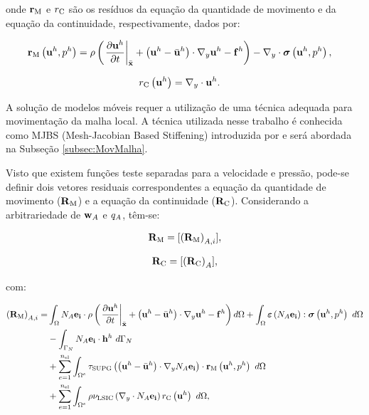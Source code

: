 \documentclass[tese_patricia]{subfiles}%
\begin{document}
\noindent onde $\mathbf{r}_{\mathrm{M}}$ e ${r}_{\mathrm{C}}$ são os resíduos da equação da quantidade de movimento e da equação da continuidade, respectivamente, dados por:

\begin{align}
\mathbf{r}_{\mathrm{M}}\left(\mathbf{u}^h,p^h\right)&=\rho\left(\left. \frac{\partial\mathbf{u}^h}{\partial t}\right|_{\bar{\mathbf{x}}}+\left(\mathbf{u}^h - \bar{\mathbf{u}}^h \right)\cdot \nabla_y \mathbf{u}^h - \mathbf{f}^h\right) - \nabla_y \cdot \boldsymbol{\sigma}\left(\mathbf{u}^h,p^h\right),
\end{align}

\noindent

\begin{align}
{r}_{\mathrm{C}}\left(\mathbf{u}^h\right)&=\nabla_y \cdot \mathbf{u}^h.
\end{align}

A solução de modelos móveis requer a utilização de uma técnica adequada para movimentação da malha local. A técnica utilizada nesse trabalho é conhecida como MJBS (Mesh-Jacobian Based Stiffening) introduzida por  e será abordada na Subseção \ref{subsec:MovMalha}.

Visto que existem funções teste separadas para a velocidade e pressão, pode-se definir dois vetores residuais correspondentes a equação da quantidade de movimento ($\mathbf{R}_\mathrm{M}$) e a equação da continuidade ($\mathbf{R}_\mathrm{C}$). Considerando a arbitrariedade de $\mathbf{w}_{A}$ e $q_{A}$, têm-se:

\begin{align}
\mathbf{R}_\mathrm{M}  = [\left(\mathbf{R}_\mathrm{M}\right)_{A,i}],
\end{align}

\begin{align}
	\mathbf{R}_\mathrm{C} =  [\left(\mathbf{R}_\mathrm{C}\right)_{A}],
\end{align}
	
\noindent com:

\begin{align}
	\begin{split}
	\left(\mathbf{R}_\mathrm{M}\right)_{A,i} =&\int_{\Omega} N_{A}\mathbf{e_i} \cdot \rho\left(\left. \frac{\partial\mathbf{u}^h}{\partial t}\right|_{\bar{\mathbf{x}}}+\left(\mathbf{u}^h - \bar{\mathbf{u}}^h \right)\cdot \nabla_y \mathbf{u}^h - \mathbf{f}^h\right) d\Omega +\int_{\Omega} \bm{\varepsilon} \left(N_{A}\mathbf{e_i}\right) : \boldsymbol{\sigma} \left(\mathbf{u}^h,p^h\right)\ d\Omega\\ &
	- \int_{\Gamma_N}N_{A}\mathbf{e_i} \cdot \mathbf{h}^h\ d\Gamma_{N}\\ 
	&+ \sum_{e=1}^{n_{\mathrm{el}}} \int_{\Omega^e} \tau_{\mathrm{SUPG}} \left(\left(\mathbf{u}^h - \bar{\mathbf{u}}^h \right) \cdot \nabla_y N_{A}\mathbf{e_i}\right) \cdot \mathbf{r}_{\mathrm{M}}\left(\mathbf{u}^h,p^h \right)\  d\Omega\\
	&+ \sum_{e=1}^{n_{\mathrm{el}}} \int_{\Omega^e} \rho \nu_{\mathrm{LSIC}} \left(\nabla_y \cdot N_{A}\mathbf{e_i}\right) {r}_{\mathrm{C}}\left(\mathbf{u}^h\right)\  d\Omega  ,
	\end{split}
\end{align}
\end{document}
